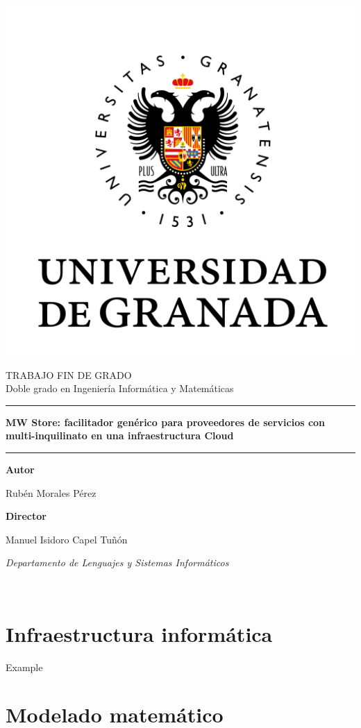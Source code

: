 \documentclass[11pt,spanish]{article} %
\title{  } %
\author{ }
\date{ } %
\begin{document}
\begin{center}
  \includegraphics[scale=0.4]{img/logo_ugr.png}
\end{center}

\begin{center}
  \Large TRABAJO FIN DE GRADO\\ 
  \large Doble grado en Ingeniería Informática y Matemáticas
  \vspace{0.7cm}

  \hrule
  \vspace{0.2cm}
  \textbf{\LARGE MW Store: facilitador genérico para proveedores de servicios con multi-inquilinato en una infraestructura Cloud}
  \vspace{0.2cm}
  \hrule
  \vspace{2cm}
  
  \textbf{Autor}

  Rubén Morales Pérez

  \vspace{2cm}
  \textbf{Director}

  Manuel Isidoro Capel Tuñón

  \textit{Departamento de Lenguajes y Sistemas Informáticos}
\end{center}

\newpage

\ 
\thispagestyle{empty}

\maketitle
\tableofcontents %
\setlength\parindent{0pt} %

\newpage

\section{Infraestructura informática}

Example \cite{example}

\newpage
\section{Modelado matemático}

\newpage


\printbibliography
\end{document}
